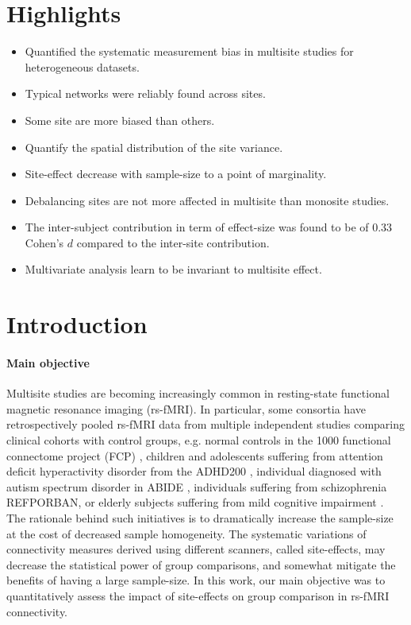 \documentclass[authoryear]{elsarticle}
\begin{document}

\section*{Highlights}

\begin{itemize}
\item Quantified the systematic measurement bias in multisite studies for heterogeneous datasets. 
\item Typical networks were reliably found across sites.
\item Some site are more biased than others.
\item Quantify the spatial distribution of the site variance.
\item Site-effect decrease with sample-size to a point of marginality.
\item Debalancing sites are not more affected in multisite than monosite studies.
\item The inter-subject contribution in term of effect-size was found to be of 0.33 Cohen's $d$ compared to the inter-site contribution.
\item Multivariate analysis learn to be invariant to multisite effect.
\end{itemize}

\section{Introduction}

\paragraph{Main objective}
Multisite studies are becoming increasingly common in resting-state functional magnetic resonance imaging (rs-fMRI). In particular, some consortia have retrospectively pooled rs-fMRI data from multiple independent studies comparing clinical cohorts with control groups, e.g. normal controls in the 1000 functional connectome project (FCP) \citep{Biswal2010}, children and adolescents suffering from attention deficit hyperactivity disorder from the ADHD200 \citep{ADHD200,Fair2012}, individual diagnosed with autism spectrum disorder in ABIDE \citep{Nielsen2013}, individuals suffering from schizophrenia REFPORBAN, or elderly subjects suffering from mild cognitive impairment \citep{Tam2015}. The rationale behind such initiatives is to dramatically increase the sample-size at the cost of decreased sample homogeneity. The systematic variations of connectivity measures derived using different scanners, called site-effects, may decrease the statistical power of group comparisons, and somewhat mitigate the benefits of having a large sample-size. In this work, our main objective was to quantitatively assess the impact of site-effects on group comparison in rs-fMRI connectivity.
\end{document}
